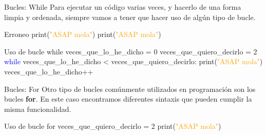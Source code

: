\documentclass{beamer}
\begin{document}
\begin{frame}{Bucles: While}
Para ejecutar un código varias veces, y hacerlo de una forma limpia y ordenada, siempre vamos a tener que hacer uso de algún tipo de bucle.
\begin{Programexample}{Erroneo}
print(\textcolor{orange}{"ASAP mola"}) \newline
print(\textcolor{orange}{"ASAP mola"})
\end{Programexample}
\begin{Programexample}{Uso de bucle while}
veces\_que\_lo\_he\_dicho = 0 \newline
veces\_que\_quiero\_decirlo = 2 \newline
\textcolor{blue}{while} veces\_que\_lo\_he\_dicho < veces\_que\_quiero\_decirlo: \newline
\hspace*{1cm} print(\textcolor{orange}{"ASAP mola"}) \newline
\hspace*{1cm} veces\_que\_lo\_he\_dicho++ %
\end{Programexample}
\end{frame}

\begin{frame}{Bucles: For}
Otro tipo de bucles comúnmente utilizados en programación son los bucles \textbf{for}. En este caso encontramos diferentes sintaxis que pueden cumplir la misma funcionalidad.
\begin{Programexample}{Uso de bucle for}
veces\_que\_quiero\_decirlo = 2 \newline
{} \newline
\hspace*{1cm} print(\textcolor{orange}{"ASAP mola"})
\end{Programexample}
\end{frame}
\end{document}
